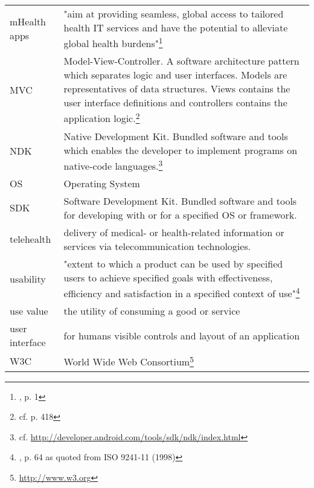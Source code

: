 \begin{longtable}{@{}p{}@{}p{}@{}}
    mHealth apps & "aim at providing seamless, global access to tailored health IT services and have the potential to alleviate global health burdens"\footnote{\cite{Dehling.2013}, p. 1} \\
    MVC & Model-View-Controller. A software architecture pattern which separates logic and user interfaces. Models are representatives of data structures. Views contains the user interface definitions and controllers contains the application logic.\footnote{cf. \cite{Hasan2011} p. 418} \\
    NDK & Native Development Kit. Bundled software and tools which enables the developer to implement programs on native-code languages.\footnote{cf. \url{http://developer.android.com/tools/sdk/ndk/index.html}} \\
    OS & Operating System \\
    SDK & Software Development Kit. Bundled software and tools for developing with or for a specified OS or framework. \\
    telehealth & delivery of medical- or health-related information or services via telecommunication technologies. \\
    usability & "extent to which a product can be used by specified users to achieve specified goals with effectiveness, efficiency and satisfaction in a specified context of use"\footnote{\cite{Yeh.2012}, p. 64 as quoted from ISO 9241-11 (1998)} \\
    use value & the utility of consuming a good or service \\
    user interface & for humans visible controls and layout of an application \\
    W3C & World Wide Web Consortium\footnote{\url{http://www.w3.org}} \\
\end{longtable}